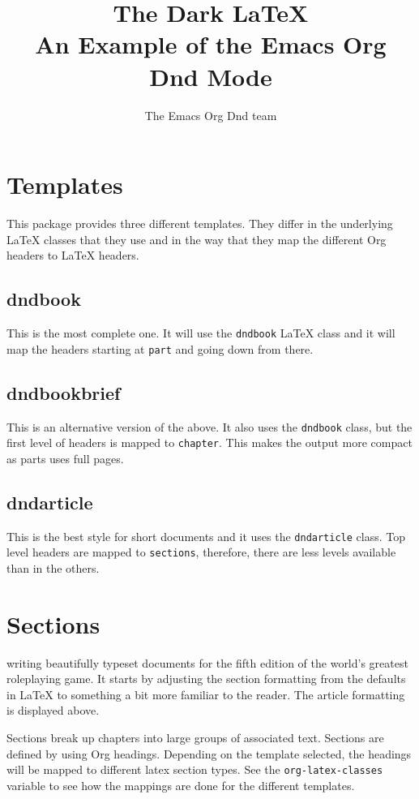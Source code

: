 \documentclass[10pt,twoside,twocolumn,openany,bg=full,notitlepage,nodeprecatedcode]{dndarticle}
\author{The Emacs Org Dnd team}
\date{}
\title{The Dark \LaTeX\\\medskip
\large An Example of the Emacs Org Dnd Mode}
\begin{document}
\maketitle
\setcounter{tocdepth}{2}
{\let\clearpage\relax \tableofcontents}

\section{Templates}
\label{sec:org1fe6b21}
This package provides three different templates. They differ in the underlying \LaTeX{} classes that they use and in the way that they map the different Org headers to \LaTeX{} headers.
\subsection{dndbook}
\label{sec:org3b9043a}
This is the most complete one. It will use the \texttt{dndbook} \LaTeX{} class and it will map the headers starting at \texttt{part} and going down from there.
\subsection{dndbookbrief}
\label{sec:org5ab7f7c}
This is an alternative version of the above. It also uses the \texttt{dndbook} class, but the first level of headers is mapped to \texttt{chapter}. This makes the output more compact as parts uses full pages.
\subsection{dndarticle}
\label{sec:org3cdd0eb}
This is the best style for short documents and it uses the \texttt{dndarticle} class. Top level headers are mapped to \texttt{sections}, therefore, there are less levels available than in the others.
\section{Sections}
\label{sec:org8b7f6b4}
 writing beautifully typeset documents for the fifth edition of the world's greatest roleplaying game. It starts by adjusting the section formatting from the defaults in \LaTeX{} to something a bit more familiar to the reader. The article formatting is displayed above.

Sections break up chapters into large groups of associated text. Sections are defined by using Org headings. Depending on the template selected, the headings will be mapped to different latex section types. See the \texttt{org-latex-classes} variable to see how the mappings are done for the different templates.
\end{document}
